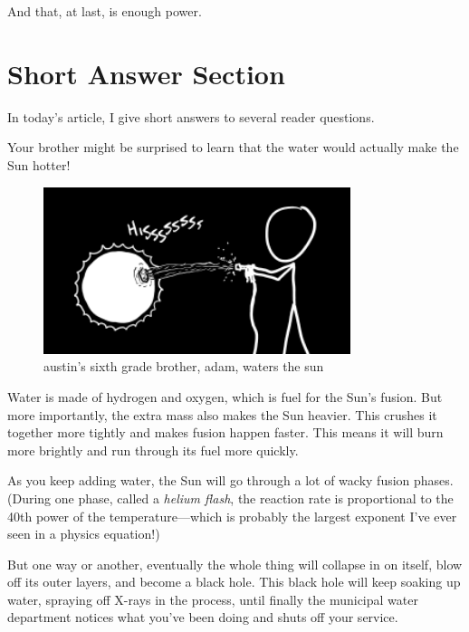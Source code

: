 {And that, at last, is enough power.}

{
\chapter{Short Answer Section}
}
{In today’s article, I give short answers to several reader questions.}


\hfill{}

{Your brother might be surprised to learn that the water would actually make the Sun hotter!}

\begin{figure}[!htbp]
\centering
\includegraphics[scale=0.5, max width=0.8\textwidth]{imgs/a/14/short_answers_sun.png}
\caption{austin's sixth grade brother, adam, waters the sun}
\end{figure}

{Water is made of hydrogen and oxygen, which is fuel for the Sun’s fusion. But more importantly, the extra mass also makes the Sun heavier. This crushes it together more tightly and makes fusion happen faster. This means it will burn more brightly and run through its fuel more quickly.}

{As you keep adding water, the Sun will go through a lot of wacky fusion phases. (During one phase, called a \emph{helium flash}, the reaction rate is proportional to the 40th power of the temperature—which is probably the largest exponent I’ve ever seen in a physics equation!)}

{But one way or another, eventually the whole thing will collapse in on itself, blow off its outer layers, and become a black hole. This black hole will keep soaking up water, spraying off X-rays in the process, until finally the municipal water department notices what you’ve been doing and shuts off your service.}

